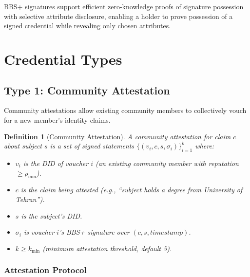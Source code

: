 \documentclass[11pt,a4paper]{article}
\newtheorem{definition}{Definition}
\begin{document}
BBS+ signatures support efficient zero-knowledge proofs of signature possession with selective attribute disclosure, enabling a holder to prove possession of a signed credential while revealing only chosen attributes.

\section{Credential Types}

\subsection{Type 1: Community Attestation}

Community attestations allow existing community members to collectively vouch for a new member's identity claims.

\begin{definition}[Community Attestation]
A community attestation for claim $c$ about subject $s$ is a set of signed statements $\{(v_i, c, s, \sigma_i)\}_{i=1}^{k}$ where:
\begin{itemize}
    \item $v_i$ is the DID of voucher $i$ (an existing community member with reputation $\geq \rho_{\min}$).
    \item $c$ is the claim being attested (e.g., ``subject holds a degree from University of Tehran'').
    \item $s$ is the subject's DID.
    \item $\sigma_i$ is voucher $i$'s BBS+ signature over $(c, s, \mathit{timestamp})$.
    \item $k \geq k_{\min}$ (minimum attestation threshold, default 5).
\end{itemize}
\end{definition}

\subsubsection{Attestation Protocol}
\end{document}
